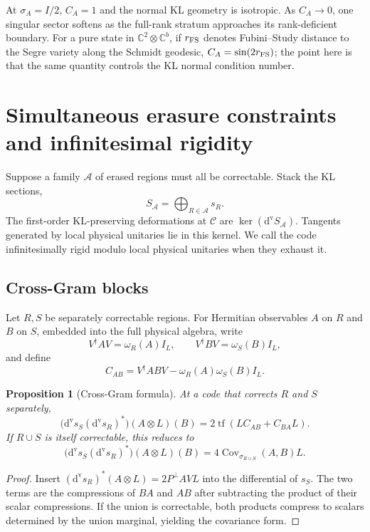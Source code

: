 \documentclass[11pt]{article}
\newtheorem{proposition}[theorem]{Proposition}
\theoremstyle{definition}
\newcommand{\cC}{\mathcal C}
\newcommand{\tf}{\operatorname{tf}}
\newcommand{\Cov}{\operatorname{Cov}}
\newcommand{\C}{\mathbb C}
\newcommand{\dvs}{\mathrm d^{\mathrm v}\!s}
\newcommand{\dvS}{\mathrm d^{\mathrm v}\!S}
\begin{document}
At $\sigma_A=I/2$, $C_A=1$ and the normal KL geometry is isotropic. As $C_A\to0$, one singular sector softens as the full-rank stratum approaches its rank-deficient boundary. For a pure state in $\C^2\otimes\C^b$, if $r_{\rm FS}$ denotes Fubini--Study distance to the Segre variety along the Schmidt geodesic, $C_A=\sin(2r_{\rm FS})$; the point here is that the same quantity controls the KL normal condition number.

\section{Simultaneous erasure constraints and infinitesimal rigidity}
Suppose a family $\mathcal A$ of erased regions must all be correctable. Stack the KL sections,
\begin{equation}
S_{\mathcal A}=\bigoplus_{R\in\mathcal A}s_R.
\end{equation}
The first-order KL-preserving deformations at $\cC$ are $\ker(\dvS_{\mathcal A})$. Tangents generated by local physical unitaries lie in this kernel. We call the code infinitesimally rigid modulo local physical unitaries when they exhaust it.

\subsection{Cross-Gram blocks}
Let $R,S$ be separately correctable regions. For Hermitian observables $A$ on $R$ and $B$ on $S$, embedded into the full physical algebra, write
\[
V^\dagger AV=\omega_R(A)I_L,\qquad V^\dagger BV=\omega_S(B)I_L,
\]
and define
\[
C_{AB}=V^\dagger ABV-\omega_R(A)\omega_S(B)I_L.
\]

\begin{proposition}[Cross-Gram formula]
At a code that corrects $R$ and $S$ separately,
\begin{equation}
\bigl(\dvs_S(\dvs_R)^*\bigr)(A\otimes L)(B)=2\tf\!\left(LC_{AB}+C_{BA}L\right).
\label{eq:crossgram}
\end{equation}
If $R\cup S$ is itself correctable, this reduces to
\begin{equation}
\bigl(\dvs_S(\dvs_R)^*\bigr)(A\otimes L)(B)=4\Cov_{\sigma_{R\cup S}}(A,B)L.
\end{equation}
\end{proposition}
\begin{proof}
Insert $(\dvs_R)^*(A\otimes L)=2P^\perp AVL$ into the differential of $s_S$. The two terms are the compressions of $BA$ and $AB$ after subtracting the product of their scalar compressions. If the union is correctable, both products compress to scalars determined by the union marginal, yielding the covariance form.
\end{proof}
\end{document}

